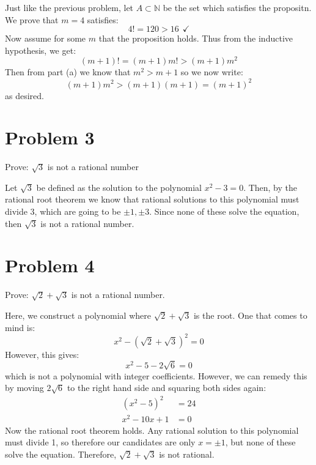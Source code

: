 \documentclass[10pt]{article}
\begin{document}
\begin{enumerate}[(a)]
\begin{enumerate}[(i)]
            \begin{solution}
                Just like the previous problem, let $A \subset \mathbb N$ be the set which satisfies the propositn. We prove that $m = 4$ satisfies: 
                \[ 4! = 120 > 16 \ \ \checkmark\] 
                Now assume for some $m$ that the proposition holds. Thus from the inductive hypothesis, we get: 
                \[ (m+1)! = (m+1)m! > (m+1)m^2\] 
                Then from part (a) we know that $m^2 > m+1$ so we now write:
                \[ (m+1)m^2 > (m+1)(m+1) = (m+1)^2\]
                as desired.
            \end{solution}
        \end{enumerate}
    \end{enumerate}

    \pagebreak

    \section*{Problem 3}

    Prove: $\sqrt 3$ is not a rational number

    \begin{solution}
        Let $\sqrt{3}$ be defined as the solution to the polynomial $x^2 - 3 = 0$. Then, by the rational root theorem we know that rational solutions to this polynomial must divide 3, which are going to be $\pm 1, \pm 3$. Since none of these solve the equation, then $\sqrt{3}$ is not a rational number.
    \end{solution}

    \pagebreak

    \section*{Problem 4}

    Prove: $\sqrt 2 + \sqrt 3$ is not a rational number.

    \begin{solution}
        Here, we construct a polynomial where $\sqrt{2} + \sqrt{3}$ is the root. One that comes to mind is: 
        \[ x^2 - (\sqrt{2} + \sqrt{3})^2 = 0\] 
        However, this gives:
        \[ x^2 - 5 - 2\sqrt{6} = 0\] 
        which is not a polynomial with integer coefficients. However, we can remedy this by moving $2\sqrt{6}$ to the right hand side and squaring both sides again:
        \begin{align*}
            (x^2 - 5)^2 &= 24\\
            x^2 - 10x + 1 &= 0
        \end{align*}
        Now the rational root theorem holds. Any rational solution to this polynomial must divide 1, so therefore our candidates are only $x = \pm 1$, but none of these solve the equation. Therefore, $\sqrt{2} + \sqrt{3}$ is not rational.
    \end{solution}
\end{document}
